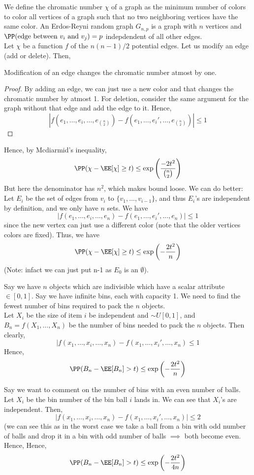 \begin{eg}
We define the chromatic number $\chi$ of a graph as the minimum number of colors to color all vertices of a graph such that no two neighboring vertices have the same color. An Erdos-Reyni random graph $G_{n,p}$ is a graph with $n$ vertices and $\PP(\text{edge between }v_i\text{ and } v_j) = p$ indepdendent of all other edges. \\
Let $\chi$ be a function $f$ of the $n(n-1)/2$ potential edges. Let us modify an edge (add or delete). Then,
\begin{lemma}
Modification of an edge changes the chromatic number atmost by one.
\end{lemma}
\begin{proof}
By adding an edge, we can just use a new color and that changes the chromatic number by atmost 1. For deletion, consider the same argument for the graph without that edge and add the edge to it. Hence,
\[
\left|f(e_1, \dots, e_i, \dots, e_{\binom n2}) - f(e_1, \dots, e_i', \dots, e_{\binom n2})\right| \leq 1 
\]
\end{proof}
Hence, by Mcdiarmid's inequality,
\[
\PP(\chi - \EE[\chi] \geq t) \leq \exp\left(\frac{-2t^2}{\binom n2}\right)
\]
But here the denominator has $n^2$, which makes bound loose. We can do better:
Let $E_i$ be the set of edges from $v_i$ to $\{v_1, \dots, v_{i-1}\}$, and thus $E_i$'s are independent by definition, and we only have $n$ sets. We have
\[
\left|f(e_1, \dots, e_i, \dots, e_n) - f(e_1, \dots, e_i', \dots, e_n)\right| \leq 1
\]
since the new vertex can just use a different color (note that the older vertices colors are fixed). Thus, we have
\[
\PP(\chi - \EE[\chi] \geq t) \leq \exp\left(-\frac{2t^2}{n}\right)
\]
(Note: infact we can just put n-1 as $E_0$ is an $\emptyset$).
\end{eg}
\begin{eg}
Say we have $n$ objects which are indivisible which have a scalar attribute $\in [0,1]$. Say we have infinite bins, each with capacity 1. We need to find the fewest number of bins required to pack the $n$ objects.\\ Let $X_i$ be the size of item $i$ be independent and $\sim U[0,1]$, and $B_n = f(X_1, \dots, X_n)$ be the number of bins needed to pack the $n$ objects. Then clearly,
\[
|f(x_1, \dots, x_i, \dots, x_n) - f(x_1, \dots, x_i', \dots, x_n) \leq 1
\]
Hence, 
\[
\PP(B_n - \EE[B_n] > t) \leq \exp\left(-\frac{2t^2}{n}\right)
\]
\end{eg}
\begin{eg}
Say we want to comment on the number of bins with an even number of balls. Let $X_i$ be the bin number of the bin ball $i$ lands in. We can see that $X_i$'s are independent. Then,
\[
|f(x_1, \dots, x_i, \dots, x_n) - f(x_1, \dots, x_i', \dots, x_n)| \leq 2
\]
(we can see this as in the worst case we take a ball from a bin with odd number of balls and drop it in a bin with odd number of balls $\implies$ both become even. Hence,
Hence, 
\[
\PP(B_n - \EE[B_n] > t) \leq \exp\left(-\frac{2t^2}{4n}\right)
\]
\end{eg}
